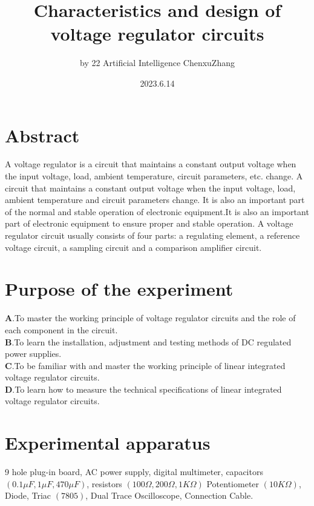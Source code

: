\documentclass[UTF8]{article}
\title{Characteristics and design of voltage regulator circuits}
\author{by 22 Artificial Intelligence ChenxuZhang}
\date{2023.6.14}
\begin{document}
	
	\fancyfoot[C]{\thepage}
	
	\maketitle
	\tableofcontents
	\newpage
	
	\section{Abstract}
A voltage regulator is a circuit that maintains a constant output voltage when the input voltage, load, ambient temperature, circuit parameters, etc. change. A circuit that maintains a constant output voltage when the input voltage, load, ambient temperature and circuit parameters change. It is also an important part of the normal and stable operation of electronic equipment.It is also an important part of electronic equipment to ensure proper and stable operation. A voltage regulator circuit usually consists of four parts: a regulating element, a reference voltage circuit, a sampling circuit and a comparison amplifier circuit.
 
	
\section{Purpose of the experiment}
   $\bm{A}$.To master the working principle of voltage regulator circuits and the role of each component in the circuit.\\
   $\bm{B}$.To learn the installation, adjustment and testing methods of DC regulated power supplies.\\
   $\bm{C}$.To be familiar with and master the working principle of linear integrated voltage regulator circuits.\\
   $\bm{D}$.To learn how to measure the technical specifications of linear integrated voltage regulator circuits.

	\section{Experimental apparatus}
    9 hole plug-in board, AC power supply, digital multimeter, capacitors $(0.1\mu F,1\mu F,470\mu F)$, resistors $(100\Omega ,200\Omega , 1K\Omega)$ Potentiometer $(10K\Omega)$, Diode, Triac $(7805)$, Dual Trace Oscilloscope, Connection Cable.
    
\end{document}
